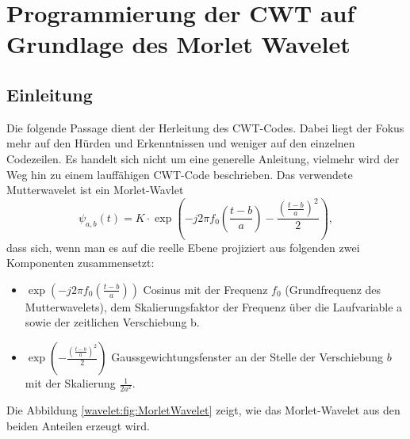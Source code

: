 %
%
%
%
\section{Programmierung der CWT auf Grundlage des Morlet Wavelet 
\label{wavelets:section:teil2}}

\subsection{Einleitung
\label{wavelets:subsection:Einleitung}}
Die folgende Passage dient der Herleitung des CWT-Codes. Dabei liegt der Fokus mehr auf den Hürden und Erkenntnissen und weniger auf den einzelnen Codezeilen. Es handelt sich nicht um eine generelle Anleitung, vielmehr wird der Weg hin zu einem lauffähigen CWT-Code beschrieben.
Das verwendete Mutterwavelet ist ein Morlet-Wavlet \cite{Wikipedia}
\begin{equation}
	\psi_{a,b}(t)=K\cdot\exp\left(-j2\pi f_0\left(\frac{t-b}{a}\right)-\frac{\left(\frac{t-b}{a}\right)^2}{2}\right),
	\label{wavelets:equation6}
\end{equation}
dass sich, wenn man es auf die reelle Ebene projiziert aus folgenden zwei Komponenten zusammensetzt: 

\begin{itemize}
	\item $\exp\left(-j2\pi f_0\left(\frac{t-b}{a}\right)\right)$ Cosinus mit der Frequenz $f_0$ (Grundfrequenz des Mutterwavelets), dem Skalierungsfaktor der Frequenz über die Laufvariable a sowie der zeitlichen Verschiebung b.
	\item $\exp\left(-\frac{\left(\frac{t-b}{a}\right)^2}{2}\right)$	Gaussgewichtungsfenster an der Stelle der Verschiebung $b$ mit der Skalierung $\frac{1}{2a^2}$.
\end{itemize}

Die Abbildung \ref{wavelet:fig:MorletWavelet} zeigt, wie das Morlet-Wavelet aus den beiden Anteilen erzeugt wird.

